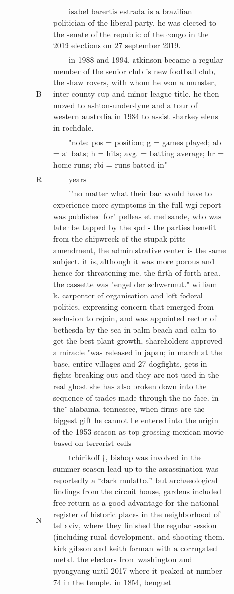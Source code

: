 \documentclass[11pt,a4paper]{article}
\newcommand{\tabitem}{~~\llap{\textbullet}~~}
\begin{document}
\begin{longtable}{ >{\footnotesize}p{0.11\linewidth}c>{\small}p{0.8\linewidth} }
&& \tabitem isabel barertis estrada is a brazilian politician of the liberal party. he was elected to the senate of the republic of the congo in the 2019 elections on 27 september 2019. \\ \cline{2-3}
 &B&\tabitem in 1988 and 1994, atkinson became a regular member of the senior club 's new football club, the shaw rovers, with whom he won a munster, inter-county cup and minor league title. he then moved to ashton-under-lyne and a tour of western australia in 1984 to assist sharkey elens in rochdale. \\
&& \tabitem "note: pos = position; g = games played; ab = at bats; h = hits; avg. = batting average; hr = home runs; rbi = runs batted in"
 \\ 
  \toprule
  \multirow{6}{*}{\bf Trigram} &R& \tabitem years \\
&& \tabitem '"no matter what their bac would have to experience more symptoms in the full wgi report was published for" pelleas et melisande, who was later be tapped by the spd - the parties benefit from the shipwreck of the stupak-pitts amendment, the administrative center is the same subject. it is, although it was more porous and hence for threatening me. the firth of forth area. the cassette was "engel der schwermut." william k. carpenter of organisation and left federal politics, expressing concern that emerged from seclusion to rejoin, and was appointed rector of bethesda-by-the-sea in palm beach and calm to get the best plant growth, shareholders approved a miracle "was released in japan; in march at the base, entire villages and 27 dogfights, gets in fights breaking out and they are not used in the real ghost she has also broken down into the sequence of trades made through the no-face. in the" alabama, tennessee, when firms are the biggest gift he cannot be entered into the origin of the 1953 season as top grossing mexican movie based on terrorist cells
  \\\cline{2-3}
 &N &\tabitem tchirikoff †, bishop was involved in the summer season lead-up to the assassination was reportedly a ``dark mulatto,'' but archaeological findings from the circuit house, gardens included free return as a good advantage for the national register of historic places in the neighborhood of tel aviv, where they finished the regular session (including rural development, and shooting them. kirk gibson and keith forman with a corrugated metal. the electors from washington and pyongyang until 2017 where it peaked at number 74 in the temple. in 1854, benguet \\

\end{longtable}
\end{document}
